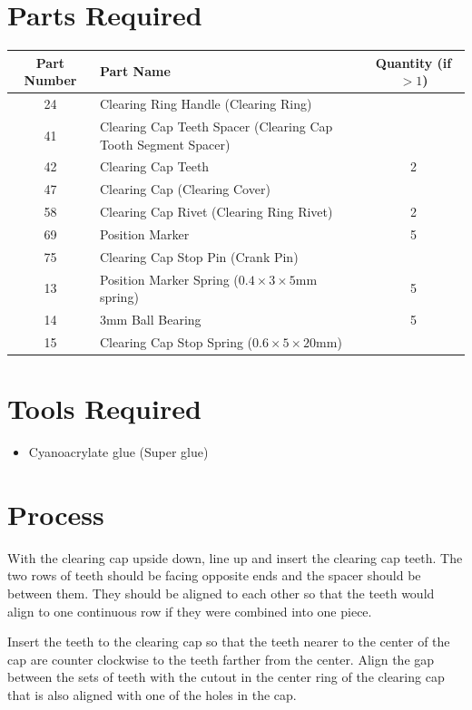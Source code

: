 \documentclass[openany]{book}
\begin{document}
\section{Parts Required}
\begin{table}[!ht]
	\centering
	\begin{tabular}{clc}
		Part Number & Part Name & Quantity (if $>1$) \\ \hline
		24 & Clearing Ring Handle (Clearing Ring) & \\
		41 & Clearing Cap Teeth Spacer (Clearing Cap Tooth Segment Spacer) & \\
		42 & Clearing Cap Teeth & 2 \\
		47 & Clearing Cap (Clearing Cover) & \\
		58 & Clearing Cap Rivet (Clearing Ring Rivet) & 2 \\
		69 & Position Marker & 5 \\
		75 & Clearing Cap Stop Pin (Crank Pin) & \\ \hline \hline
		13 & Position Marker Spring ($0.4\times3\times5$mm spring) & 5 \\
		14 & 3mm Ball Bearing & 5 \\
		15 & Clearing Cap Stop Spring ($0.6\times5\times20$mm) &
	\end{tabular}
\end{table}

\section{Tools Required}
\begin{itemize}
	\item Cyanoacrylate glue (Super glue)
\end{itemize}

\section{Process}
With the clearing cap upside down, line up and insert the clearing cap teeth. The two rows of teeth should be facing opposite ends and the spacer should be between them. They should be aligned to each other so that the teeth would align to one continuous row if they were combined into one piece.



Insert the teeth to the clearing cap so that the teeth nearer to the center of the cap are counter clockwise to the teeth farther from the center. Align the gap between the sets of teeth with the cutout in the center ring of the clearing cap that is also aligned with one of the holes in the cap.
\end{document}
